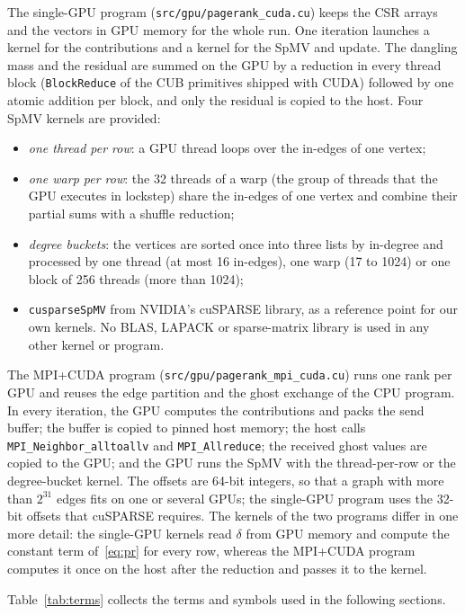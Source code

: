 \documentclass[11pt,a4paper]{article}
\newcommand{\code}[1]{\texttt{#1}}
\begin{document}
The single-GPU program (\code{src/gpu/pagerank\_cuda.cu}) keeps the CSR arrays and the vectors in GPU memory for the
whole run. One iteration launches a kernel for the contributions and a kernel for the SpMV and update. The dangling
mass and the residual are summed on the GPU by a reduction in every thread block (\code{BlockReduce} of the CUB
primitives shipped with CUDA) followed by one atomic addition per block, and only the residual is copied to the host. Four SpMV kernels are provided:
\begin{itemize}
\item \emph{one thread per row}: a GPU thread loops over the in-edges of one vertex;
\item \emph{one warp per row}: the 32 threads of a warp (the group of threads that the GPU executes in lockstep)
  share the in-edges of one vertex and combine their partial sums with a shuffle reduction;
\item \emph{degree buckets}: the vertices are sorted once into three lists by in-degree and processed by one thread
  (at most 16 in-edges), one warp (17 to 1024) or one block of 256 threads (more than 1024);
\item \code{cusparseSpMV} from NVIDIA's cuSPARSE library, as a reference point for our own kernels. No BLAS,
  LAPACK or sparse-matrix library is used in any other kernel or program.
\end{itemize}

The MPI+CUDA program (\code{src/gpu/pagerank\_mpi\_cuda.cu}) runs one rank per GPU and reuses the edge partition and
the ghost exchange of the CPU program. In every iteration, the GPU computes the contributions and packs the send
buffer; the buffer is copied to pinned host memory; the host calls \code{MPI\_Neighbor\_alltoallv} and
\code{MPI\_Allreduce}; the received ghost values are copied to the GPU; and the GPU runs the SpMV with the
thread-per-row or the degree-bucket kernel. The offsets are 64-bit integers, so that a graph with more than $2^{31}$
edges fits on one or several GPUs; the single-GPU program uses the 32-bit offsets that cuSPARSE requires. The
kernels of the two programs differ in one more detail: the single-GPU kernels read $\delta$ from GPU memory and
compute the constant term of~\eqref{eq:pr} for every row, whereas the MPI+CUDA program computes it once on the host
after the reduction and passes it to the kernel.

Table~\ref{tab:terms} collects the terms and symbols used in the following sections.
\end{document}

